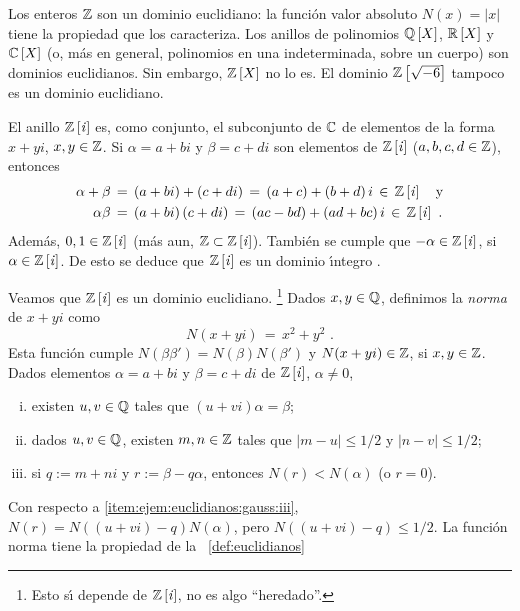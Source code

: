 \begin{ejemEuclidianos}\label{ejem:euclidianos}
	Los enteros $\mathbb{Z}$ son un dominio euclidiano: la funci\'on
	valor absoluto $N(x)=|x|$ tiene la propiedad que los caracteriza.
	Los anillos de polinomios ${\mathbb{Q}}\left[X\right]$,
	${\mathbb{R}}\left[X\right]$ y ${\mathbb{C}}\left[X\right]$ (o, m\'as en
	general, polinomios en una indeterminada, sobre un cuerpo) son
	dominios euclidianos. Sin embargo, ${\mathbb{Z}}\left[X\right]$ no lo es.
	El dominio ${\mathbb{Z}}\left[\sqrt{-6}\right]$ tampoco es un dominio
	euclidiano.
\end{ejemEuclidianos}

\begin{ejemEuclidianos}\label{ejem:euclidianos:gauss}
	El anillo ${\mathbb{Z}}\left[\mathit i\right]$ es, como conjunto, el subconjunto
	de $\mathbb{C}$ de elementos de la forma $x+yi$, $x,y\in\mathbb{Z}$.
	Si $\alpha=a+bi$ y $\beta=c+di$ son elementos de
	${\mathbb{Z}}\left[\mathit i\right]$ ($a,b,c,d\in\mathbb{Z}$), entonces
	\begin{displaymath}
		\begin{aligned}
			\alpha+\beta & \,=\,(a+bi)+(c+di)\,=\,(a+c)+(b+d)\,i
				\,\in\,{\mathbb{Z}}\left[\mathit i\right]\quad\text{y} \\
			\alpha\beta & \,=\,(a+bi)\,(c+di)\,=\,
				(ac-bd)+(ad+bc)\,i
				\,\in\,{\mathbb{Z}}\left[\mathit i\right]
			\text{ .}
		\end{aligned}
	\end{displaymath}
	Adem\'as, $0,1\in{\ensuremath{\mathbb{Z}}}\left[\mathit i\right]$ (m\'as aun,
	$\mathbb{Z}\subset{\ensuremath{\mathbb{Z}}}\left[\mathit i\right]$). Tambi\'en se cumple que
	$-\alpha\in{\ensuremath{\mathbb{Z}}}\left[\mathit i\right]$, si $\alpha\in{\ensuremath{\mathbb{Z}}}\left[\mathit i\right]$.
	De esto se deduce que ${\mathbb{Z}}\left[\mathit i\right]$ es un dominio \'{\i}ntegro
	\quedacomoejercicio.%

	Veamos que ${\mathbb{Z}}\left[\mathit i\right]$ es un dominio euclidiano.%
	\footnote{
		Esto s\'{\i} depende de ${\mathbb{Z}}\left[\mathit i\right]$, no es algo
		``heredado''.
	}
	Dados $x,y\in\mathbb{Q}$, definimos la \emph{norma} de $x+yi$
	como
	\begin{displaymath}
		N(x+yi)\,=\,x^2+y^2
		\text{ .}
	\end{displaymath}
	Esta funci\'on cumple $N(\beta\beta')=N(\beta)N(\beta')$ y
	$N(x+yi)\in\mathbb{Z}$, si $x,y\in\mathbb{Z}$.
	Dados elementos $\alpha=a+bi$ y $\beta=c+di$ de ${\mathbb{Z}}\left[\mathit i\right]$,
	$\alpha\neq 0$,
	\begin{enumerate}[(i)]
		\item\label{item:ejem:euclidianos:gauss:i}
			existen $u,v\in\mathbb{Q}$ tales que
			$(u+vi)\alpha=\beta$;
		\item\label{item:ejem:euclidianos:gauss:ii}
			dados $u,v\in\mathbb{Q}$, existen $m,n\in\mathbb{Z}$
			tales que $|m-u|\leq 1/2$ y $|n-v|\leq 1/2$;
		\item\label{item:ejem:euclidianos:gauss:iii}
			si $q:=m+ni$ y $r:=\beta-q\alpha$, entonces
			$N(r)<N(\alpha)$ (o $r=0$).
	\end{enumerate}
	Con respecto a \eqref{item:ejem:euclidianos:gauss:iii},
	$N(r)=N((u+vi)-q)N(\alpha)$, pero $N((u+vi)-q)\leq 1/2$. La funci\'on
	norma tiene la propiedad de la ~\ref{def:euclidianos}
\end{ejemEuclidianos}

